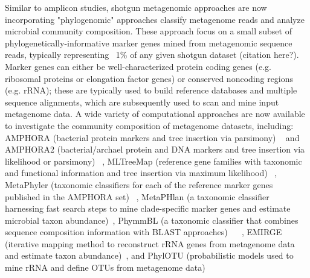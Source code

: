 \documentclass[10pt]{article}
\begin{document}
Similar to amplicon studies, shotgun metagenomic approaches are now incorporating "phylogenomic" approaches classify metagenome reads and analyze microbial community composition. 
These approach focus on a small subset of phylogenetically-informative marker genes mined from metagenomic sequence reads, typically representing ~1\% of any given shotgun dataset (citation here?). 
Marker genes can either be well-characterized protein coding genes (e.g. ribosomal proteins or elongation factor genes) or conserved noncoding regions (e.g. rRNA); these are typically used to build reference databases and multiple sequence alignments, which are subsequently used to scan and mine input metagenome data. 
A wide variety of computational approaches are now available to investigate the community composition of metagenome datasets, including: AMPHORA (bacterial protein markers and tree insertion via parsimony) ~\cite{WuEisen2008} and AMPHORA2 (bacterial/archael protein and DNA markers and tree insertion via likelihood or parsimony) ~\cite{Wu2012}, MLTreeMap (reference gene families with taxonomic and functional information and tree insertion via maximum likelihood) ~\cite{Stark2010}, MetaPhyler (taxonomic classifiers for each of the reference marker genes published in the AMPHORA set) ~\cite{Liu2010}, MetaPHlan (a taxonomic classifier harnessing fast search steps to mine clade-specific marker genes and estimate microbial taxon abundance)~\cite{Segata2012}, PhymmBL (a taxonomic classifier that combines sequence composition information with BLAST approaches)  ~\cite{Brady2009} ~\cite{Brady2011}, EMIRGE (iterative mapping method to reconstruct rRNA genes from metagenome data and estimate taxon abundance)~\cite{Miller2011}, and PhylOTU (probabilistic models used to mine rRNA and define OTUs from metagenome data)\cite{Sharpton2011}
\end{document}
